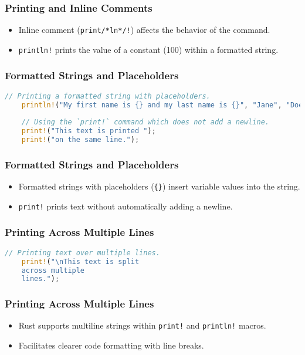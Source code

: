 \documentclass[aspectratio=169, table]{beamer}
\begin{document}
\begin{frame}
\frametitle{Printing and Inline Comments}
\begin{itemize}
	\item Inline comment (\texttt{print/*ln*/!}) affects the behavior of the command.
	\item \texttt{println!} prints the value of a constant (100) within a formatted string.
\end{itemize}
\end{frame}

\begin{frame}[fragile]
\frametitle{Formatted Strings and Placeholders}
\begin{lstlisting}[language=Rust]
	// Printing a formatted string with placeholders.
	println!("My first name is {} and my last name is {}", "Jane", "Doe");
	
	// Using the `print!` command which does not add a newline.
	print!("This text is printed ");
	print!("on the same line.");
\end{lstlisting}
\end{frame}

\begin{frame}
\frametitle{Formatted Strings and Placeholders}
\begin{itemize}
	\item Formatted strings with placeholders (\texttt{\{\}}) insert variable values into the string.
	\item \texttt{print!} prints text without automatically adding a newline.
\end{itemize}
\end{frame}

\begin{frame}[fragile]
\frametitle{Printing Across Multiple Lines}
\begin{lstlisting}[language=Rust]
	// Printing text over multiple lines.
	print!("\nThis text is split
	across multiple 
	lines."); 
\end{lstlisting}
\end{frame}

\begin{frame}
\frametitle{Printing Across Multiple Lines}
\begin{itemize}
	\item Rust supports multiline strings within \texttt{print!} and \texttt{println!} macros.
	\item Facilitates clearer code formatting with line breaks.
\end{itemize}
\end{frame}
\end{document}

